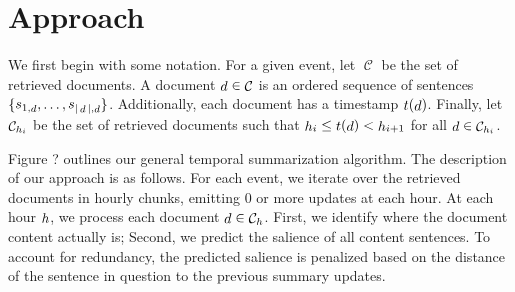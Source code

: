\documentclass[10pt]{article} \usepackage{url} \usepackage{color}
\DeclareMathOperator{\corpus}{\mathcal{C}}
\DeclareMathOperator{\doc}{\mathnormal{d}}
\DeclareMathOperator{\sent}{\mathnormal{s}}
\DeclareMathOperator{\dtime}{\mathnormal{t}}
\DeclareMathOperator{\hour}{\mathnormal{h}}
\begin{document}
%
%
%
%



\section{Approach}\label{sec:approach}


We first begin with some notation. For a given event, let $\corpus$ be the set
of retrieved documents. A document $\doc \in \corpus$ is an ordered sequence
of sentences $\{\sent_{1,\doc},\ldots,\sent_{|\doc|,\doc} \}$. 
Additionally, each document has a timestamp $\dtime(\doc)$. Finally, let 
$\corpus_{\hour_i}$ be the set of retrieved documents such that 
$\hour_i \le \dtime(\doc) < \hour_{i+1}$ for all $\doc \in \corpus_{\hour_i}$.

Figure ? outlines our general temporal summarization algorithm. The description
of our approach is as follows.
For each event, we iterate over the retrieved 
documents in hourly chunks, emitting 0 or more updates at each hour.
At each hour $\hour$, we process each document
$\doc \in \corpus_{\hour}$. First, we identify where the document content
actually is; Second, we predict the salience of all content sentences.
To account for redundancy, the predicted salience is penalized based on the 
distance of the sentence in question to the previous summary updates.
\end{document}

